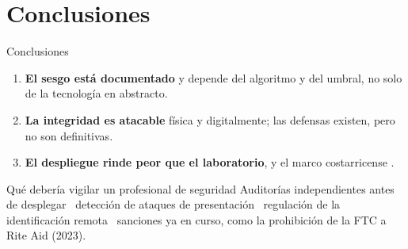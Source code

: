 \section{Conclusiones}

\begin{frame}{Conclusiones}

  \begin{enumerate}\setlength{\itemsep}{6pt}
    \item \textbf{El sesgo est\'a documentado} y depende del algoritmo y del
          umbral, no solo de la tecnolog\'ia en abstracto.
    \item \textbf{La integridad es atacable} f\'isica y digitalmente; las
          defensas existen, pero no son definitivas.
    \item \textbf{El despliegue rinde peor que el laboratorio}, y el marco
          costarricense .
  \end{enumerate}

  \begin{block}{Qu\'e deber\'ia vigilar un profesional de seguridad}
    \scriptsize
    Auditor\'ias independientes antes de desplegar \textbullet\ detecci\'on
    de ataques de presentaci\'on \textbullet\ regulaci\'on de la
    identificaci\'on remota \textbullet\ sanciones ya en curso, como la
    prohibici\'on de la FTC a Rite Aid (2023).
  \end{block}
\end{frame}

\begin{frame}[plain]
\end{frame}